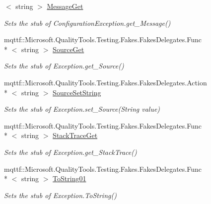 \begin{DoxyCompactItemize}
$<$ string $>$ \hyperlink{class_system_1_1_configuration_1_1_fakes_1_1_stub_configuration_exception_ad62f9cb28d83314fdd3ef7dd2bca9758}{Message\-Get}
\begin{DoxyCompactList}\small\item\em Sets the stub of Configuration\-Exception.\-get\-\_\-\-Message()\end{DoxyCompactList}\item 
mqttf\-::\-Microsoft.\-Quality\-Tools.\-Testing.\-Fakes.\-Fakes\-Delegates.\-Func\\*
$<$ string $>$ \hyperlink{class_system_1_1_configuration_1_1_fakes_1_1_stub_configuration_exception_a169ffec806dab635a5c2c4f8af8c1fd9}{Source\-Get}
\begin{DoxyCompactList}\small\item\em Sets the stub of Exception.\-get\-\_\-\-Source()\end{DoxyCompactList}\item 
mqttf\-::\-Microsoft.\-Quality\-Tools.\-Testing.\-Fakes.\-Fakes\-Delegates.\-Action\\*
$<$ string $>$ \hyperlink{class_system_1_1_configuration_1_1_fakes_1_1_stub_configuration_exception_ad22b2e51aede12e20681eb346b48b1ee}{Source\-Set\-String}
\begin{DoxyCompactList}\small\item\em Sets the stub of Exception.\-set\-\_\-\-Source(\-String value)\end{DoxyCompactList}\item 
mqttf\-::\-Microsoft.\-Quality\-Tools.\-Testing.\-Fakes.\-Fakes\-Delegates.\-Func\\*
$<$ string $>$ \hyperlink{class_system_1_1_configuration_1_1_fakes_1_1_stub_configuration_exception_aa7af811d3b9d8acf0222750a0135a2a7}{Stack\-Trace\-Get}
\begin{DoxyCompactList}\small\item\em Sets the stub of Exception.\-get\-\_\-\-Stack\-Trace()\end{DoxyCompactList}\item 
mqttf\-::\-Microsoft.\-Quality\-Tools.\-Testing.\-Fakes.\-Fakes\-Delegates.\-Func\\*
$<$ string $>$ \hyperlink{class_system_1_1_configuration_1_1_fakes_1_1_stub_configuration_exception_aff1a76117df9739cce5250914efd62a3}{To\-String01}
\begin{DoxyCompactList}\small\item\em Sets the stub of Exception.\-To\-String()\end{DoxyCompactList}\end{DoxyCompactItemize}
